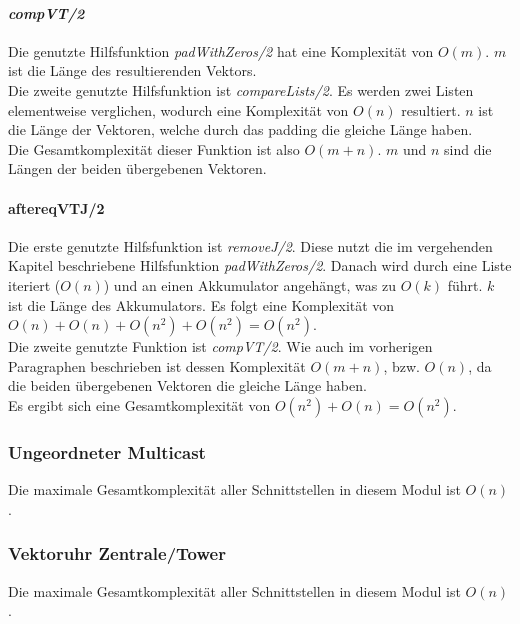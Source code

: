 \paragraph{\textit{compVT/2}}

Die genutzte Hilfsfunktion \textit{padWithZeros/2} hat eine Komplexität von $O(m)$. $m$ ist die Länge des resultierenden Vektors.\\
Die zweite genutzte Hilfsfunktion ist \textit{compareLists/2}. Es werden zwei Listen elementweise verglichen, wodurch eine Komplexität von $O(n)$ resultiert. $n$ ist die Länge der Vektoren, welche durch das padding die gleiche Länge haben.\\
Die Gesamtkomplexität dieser Funktion ist also $O(m+n)$. $m$ und $n$ sind die Längen der beiden übergebenen Vektoren.

\paragraph{aftereqVTJ/2} \label{aftereqVTJ_complexity}

Die erste genutzte Hilfsfunktion ist \textit{removeJ/2}. Diese nutzt die im vergehenden Kapitel beschriebene Hilfsfunktion \textit{padWithZeros/2}. Danach wird durch eine Liste iteriert ($O(n)$) und an einen Akkumulator angehängt, was zu $O(k)$ führt. $k$ ist die Länge des Akkumulators. Es folgt eine Komplexität von $O(n)+O(n)+O(n^2)+O(n^2)=O(n^2)$.\\
Die zweite genutzte Funktion ist \textit{compVT/2}. Wie auch im vorherigen Paragraphen beschrieben ist dessen Komplexität $O(m+n)$, bzw. $O(n)$, da die beiden übergebenen Vektoren die gleiche Länge haben.\\
Es ergibt sich eine Gesamtkomplexität von $O(n^2)+O(n)=O(n^2).$

\subsubsection{Ungeordneter Multicast}

Die maximale Gesamtkomplexität aller Schnittstellen in diesem Modul ist $O(n)$.

\subsubsection{Vektoruhr Zentrale/Tower}

Die maximale Gesamtkomplexität aller Schnittstellen in diesem Modul ist $O(n)$.